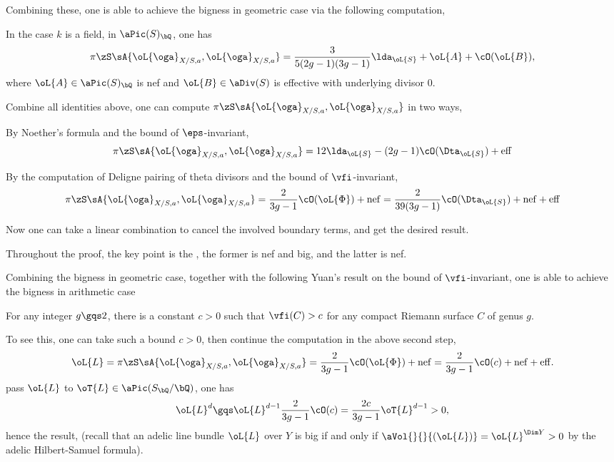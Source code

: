 \documentclass[a4paper, twoside]{article}
\begin{document}
Combining these, one is able to achieve the bigness in geometric case via the following computation,
\begin{thm}
	In the case $k$ is a field, in $\aPic(S)_{\bQ}$, one has
	\[
		\pi\zS\sA{\oL{\oga}_{X/S,a},\oL{\oga}_{X/S,a}}=\frac{3}{5(2g-1)(3g-1)}\lda_{\oL{S}}+\oL{A}+\cO(\oL{B}),
	\]
	where $\oL{A}\in\aPic(S)_{\bQ}$ is nef and $\oL{B}\in\aDiv(S)$ is effective with underlying divisor $0$.
\end{thm}

\begin{prf}
	Combine all identities above, one can compute $\pi\zS\sA{\oL{\oga}_{X/S,a},\oL{\oga}_{X/S,a}}$ in two ways,
	\begin{enr}
		\item By Noether's formula and the bound of $\eps$-invariant,
		\[
			\pi\zS\sA{\oL{\oga}_{X/S,a},\oL{\oga}_{X/S,a}}=12\lda_{\oL{S}}-(2g-1)\cO(\Dta_{\oL{S}})+ \mathrm{eff}
		\]
		\item By the computation of Deligne pairing of theta divisors and the bound of $\vfi$-invariant,
		\[
			\pi\zS\sA{\oL{\oga}_{X/S,a},\oL{\oga}_{X/S,a}}=\frac{2}{3g-1}\cO(\oL{\Phi})+ \mathrm{nef}=\frac{2}{39(3g-1)}\cO(\Dta_{\oL{S}})+ \mathrm{nef} + \mathrm{eff}
		\]
	\end{enr}
	Now one can take a linear combination to cancel the involved boundary terms, and get the desired result.
\end{prf}

\begin{rmk}
	Throughout the proof, the key point is the , the former is nef and big, and the latter is nef.
\end{rmk}

Combining the bigness in geometric case, together with the following Yuan's result on the bound of $\vfi$-invariant, one is able to achieve the bigness in arithmetic case

\begin{thm}
	For any integer $g\gqs2$, there is a constant $c>0$ such that $\vfi(C)>c$ for any compact Riemann surface $C$ of genus $g$.
\end{thm}

To see this, one can take such a bound $c>0$, then continue the computation in the above second step,
\[
	\oL{L}=\pi\zS\sA{\oL{\oga}_{X/S,a},\oL{\oga}_{X/S,a}}=\frac{2}{3g-1}\cO(\oL{\Phi})+ \mathrm{nef}=\frac{2}{3g-1}\cO(c)+ \mathrm{nef}+ \mathrm{eff}.
\]
pass $\oL{L}$ to $\oT{L}\in\aPic(S_{\bQ}/\bQ)$, one has
\[
	\oL{L}^{d}\gqs\oL{L}^{d-1}\frac{2}{3g-1}\cO(c)=\frac{2c}{3g-1}\oT{L}^{d-1}>0,
\]
hence the result, (recall that an adelic line bundle $\oL{L}$ over $Y$ is big if and only if $\aVol{}{}{(\oL{L})}=\oL{L}^{\Dim Y}>0$ by the adelic Hilbert-Samuel formula).
\end{document}
